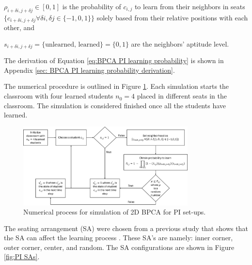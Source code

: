$\rho_{i+\delta i, j+\delta j} \in [0,1]$ is the probability of $c_{i,j}$ to learn from their neighbors in seats $\lbrace c_{i+\delta i, j+\delta j} \forall \delta i, \delta j \in \lbrace -1,0,1 \rbrace \rbrace$ solely based from their relative positions with each other, and

$s_{i+\delta i, j+\delta j} = \lbrace\text{unlearned, learned}\rbrace=\lbrace 0,1 \rbrace$ are the neighbors' aptitude level.

The derivation of Equation \ref{eq:BPCA PI learning probability} is shown in Appendix \ref{sec: BPCA PI learning probability derivation}.

The numerical procedure is outlined in Figure \ref{fig:2DBPCA PI Flowchart}. 
Each simulation starts the classroom with four learned students $n_0 = 4$ placed in different seats in the classroom. 
The simulation is considered finished once all the students have learned.

\begin{figure}[htbp!]
    \centering
    \includegraphics[width=0.8\textwidth]{figures/2DBPCA PI Flowchart.png}
    \caption[Peer instruction flowchart]{Numerical process for simulation of 2D BPCA for PI set-ups.}
    \label{fig:2DBPCA PI Flowchart}
\end{figure}

The seating arrangement (SA) were chosen from a previous study that shows that the SA can affect the learning process \cite{roxas2010seating}. 
These SA's are namely: inner corner, outer corner, center, and random. The SA configurations are shown in Figure \ref{fig:PI SAs}.

